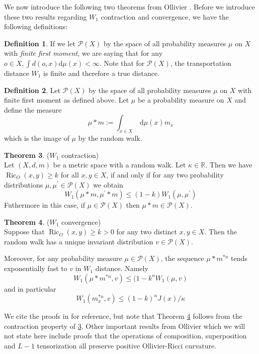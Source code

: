 \documentclass{Dissertate}
\theoremstyle{definition}
\newtheorem{theorem}{Theorem}[section]
\theoremstyle{definition} %
\theoremstyle{definition}
\newtheorem{definition}[theorem]{Definition}
\begin{document}
We now introduce the following two theorems from Ollivier \cite{ollivier_ricci_2009}. Before we introduce these two results regarding $W_1$ contraction and convergence, we have the following definitions: 
\begin{definition}
If we let $\mathcal{P}(X)$ by the space of all probability measures $\mu$ on $X$ with \textit{finite first moment},  we are saying that for any $o \in X, \int d(o, x) \mathrm{d} \mu(x)<\infty$. Note that for $\mathcal{P}(X)$, the transportation distance $W_1$ is finite and therefore a true distance. 
\end{definition}
\begin{definition}
Let $\mathcal{P}(X)$ by the space of all probability measures $\mu$ on $X$ with finite first moment as defined above. Let $\mu$ be a probability measure on $X$ and define the measure
$$
\mu * m:=\int_{x \in X} \mathrm{~d} \mu(x) m_x
$$
which is the image of $\mu$ by the random walk.
\end{definition}
\begin{theorem} \label{thm: contraction}($W_1$ contraction)  \\
Let $(X, d, m)$ be a metric space with a random walk. Let $\kappa \in \mathbb{R}$. Then we have $\operatorname{Ric}_O(x, y) \geq k$ for all $x, y \in X$, if and only if for any two probability distributions $\mu, \mu^{\prime} \in \mathcal{P}(X)$ we obtain
$$
W_1\left(\mu * m, \mu^{\prime} * m\right) \leq (1- k) W_1\left(\mu, \mu^{\prime}\right)
$$
Futhermore in this case, if $\mu \in \mathcal{P}(X)$ then $\mu * m \in \mathcal{P}(X)$.
\end{theorem}

\begin{theorem} \label{thm: convergence}($W_1$ convergence)\\
Suppose that $\operatorname{Ric}_O(x, y) \geq k>0$ for any two distinct $x, y \in X$. Then the random walk has a unique invariant distribution $v \in \mathcal{P}(X)$.

Moreover, for any probability measure $\mu \in \mathcal{P}(X)$, the sequence $\mu * m^{* n}$ tends exponentially fast to $v$ in $W_1$ distance. Namely
$$
W_1\left(\mu * m^{* n}, v\right) \leq (1- k ^n W_1(\mu, v)
$$
and in particular
$$
W_1\left(m_x^{* n}, v\right) \leq (1- k )^n J(x) / \kappa
$$
\end{theorem}
We cite the proofs in \cite{ollivier_ricci_2009} for reference, but note that Theorem \ref{thm: convergence} follows from the contraction property of \ref{thm: contraction}. Other important results from Ollivier which we will not state here include proofs that the operations of composition, superposition and $L-1$ tensorization all preserve positive Ollivier-Ricci curvature. 
\end{document}
